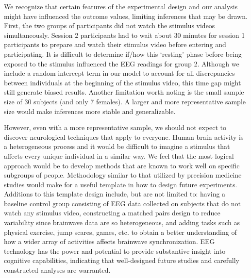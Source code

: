 \documentclass{article}[12pt]
\begin{document}
We recognize that certain features of the experimental design and our analysis might have influenced the outcome values, limiting inferences that may be drawn. First, the two groups of participants did not watch the stimulus videos simultaneously. Session 2 participants had to wait about 30 minutes for session 1 participants to prepare and watch their stimulus video before entering and participating. It is difficult to determine if/how this `resting' phase before being exposed to the stimulus influenced the EEG readings for group 2. Although we include a random intercept term in our model to account for all discrepancies between individuals at the beginning of the stimulus video, this time gap might still generate biased results. Another limitation worth noting is the small sample size of 30 subjects (and only 7 females). A larger and more representative sample size would make inferences more stable and generalizable.

However, even  with a more representative sample, we should not expect to discover neurological techniques that apply to everyone.  Human brain activity is a heterogeneous process and it would be difficult to imagine a stimulus that affects every unique individual in a similar way. We feel that the most logical approach would be to develop methods that are known to work well on specific subgroups of people.  Methodology similar to that utilized by precision medicine studies would make for a useful template in how to design future experiments.  Additions to this template design include, but are not limited to:
having a baseline control group consisting of EEG data collected on subjects that do not watch any stimulus video,
constructing a matched pairs design to reduce variability since brainwave data are so heterogeneous,
and adding tasks such as physical exercise, jump scares, games, etc. to obtain a better understanding of how a wider array of activities affects brainwave synchronization.
EEG technology has the power and potential to provide substantive insight into cognitive capabilities, indicating that well-designed future studies and carefully constructed analyses are warranted.






\end{document}
